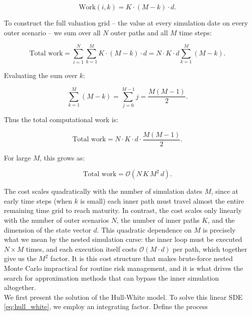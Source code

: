   \begin{equation}
  \text{Work}(i, k) = K \cdot (M - k) \cdot d.
  \end{equation}

  \noindent
  To construct the full valuation grid -- the value at every simulation date on every outer scenario -- we sum over all $N$ outer paths and all $M$ time steps:

  \begin{equation}
  \text{Total work} = \sum_{i=1}^{N} \sum_{k=1}^{M} K \cdot (M - k) \cdot d = N \cdot K \cdot d \sum_{k=1}^{M} (M - k).
  \end{equation}

  \noindent
  Evaluating the sum over $k$:

  \begin{equation}
  \sum_{k=1}^{M} (M - k) = \sum_{j=0}^{M-1} j = \frac{M(M-1)}{2}.
  \end{equation}

  \noindent
  Thus the total computational work is:

  \begin{equation}
  \text{Total work} = N \cdot K \cdot d \cdot \frac{M(M-1)}{2}.
  \end{equation}

  \noindent
  For large $M$, this grows as:

  \begin{equation}
  \text{Total work} = \mathcal{O}\!\left(N \, K \, M^{2} \, d\right).
  \end{equation}

  \noindent
     The cost scales quadratically with the number of simulation dates $M$, since at early time steps (when $k$ is small) each inner path must travel almost the entire remaining time grid to reach maturity. In contrast, the cost scales only linearly with the number of outer scenarios $N$, the number of inner paths $K$, and the dimension of the state vector $d$. This quadratic dependence on $M$ is precisely what we mean by the nested simulation curse: the inner loop must be executed $N \times M$ times, and each execution itself costs $\mathcal{O}(M \cdot d)$ per path, which together give us the $M^2$ factor. It is this cost structure that makes brute-force nested Monte Carlo impractical for routine risk management, and it is what drives the search for approximation methods that can bypass the inner simulation altogether.\\


    \noindent
    We first present the solution of the Hull-White model. To solve this linear SDE \ref{eq:hull_white}, we employ an integrating factor. Define the process

